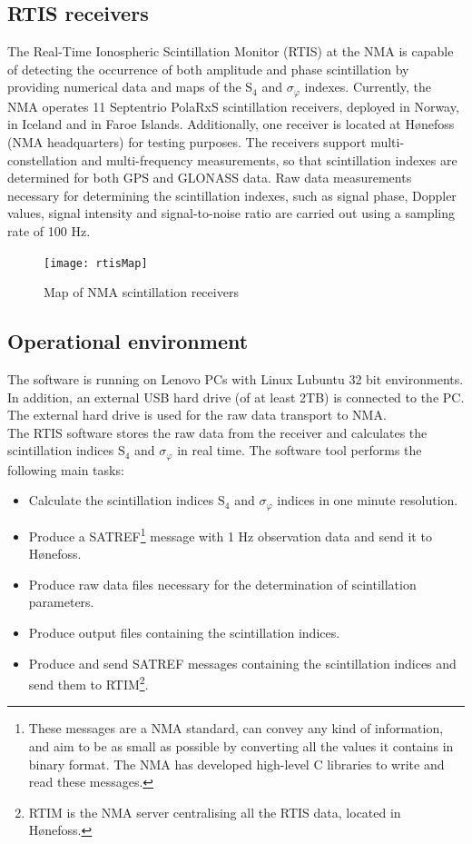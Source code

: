\documentclass{themeensg}
\begin{document}
\subsection{RTIS receivers} 
The Real-Time Ionospheric Scintillation Monitor (RTIS) at the NMA is capable of detecting the occurrence of both amplitude and phase scintillation by providing numerical data and maps of the $\text{S}_{\text{4}}$ and $\sigma_\varphi$ indexes. Currently, the NMA operates 11 Septentrio PolaRxS scintillation receivers, deployed in Norway, in Iceland and in Faroe Islands. Additionally, one receiver is located at Hønefoss (NMA headquarters) for testing purposes. The receivers support multi-constellation and multi-frequency measurements, so that scintillation indexes are determined for both GPS and GLONASS data. Raw data measurements necessary for determining the scintillation indexes, such as signal phase, Doppler values, signal intensity and signal-to-noise ratio are carried out using a sampling rate of 100 Hz. \\
 
\begin{figure}[!hb]
	\centering
	\texttt{[image: rtisMap]}
	\caption{Map of NMA scintillation receivers}
\end{figure}

\subsection{Operational environment}
The software is running on Lenovo PCs with Linux Lubuntu 32 bit environments. In addition, an external USB hard drive (of at least 2TB) is connected to the PC. The external hard drive is used for the raw data transport to NMA.\\

The RTIS software stores the raw data from the receiver and calculates the scintillation indices $\text{S}_{\text{4}}$ and $\sigma_\varphi$ in real time. 
The software tool performs the following main tasks:
\begin{itemize}
\item Calculate the scintillation indices $\text{S}_{\text{4}}$ and $\sigma_\varphi$ indices in one minute resolution.
\item Produce a SATREF\footnote{These messages are a NMA standard, can convey any kind of information, and aim to be as small as possible by converting all the values it contains in binary format. The NMA has developed high-level C libraries to write and read these messages.} message with 1 Hz observation data and send it to Hønefoss.
\item Produce raw data files necessary for the determination of scintillation parameters.
\item Produce output files containing the scintillation indices. 
\item Produce and send SATREF messages containing the scintillation indices and send them to RTIM\footnote{RTIM is the NMA server centralising all the RTIS data, located in Hønefoss.}.
\end{itemize}
\end{document}
